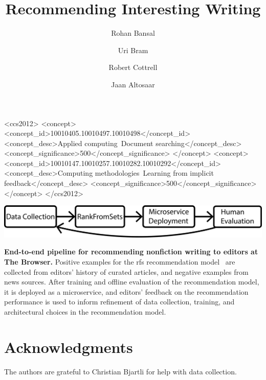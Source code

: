 \documentclass[sigconf]{acmart} %
\title{Recommending Interesting Writing}
\author{Rohan Bansal}
\affiliation{\institution{The Browser}}
\author{Uri Bram}
\affiliation{\institution{The Browser}}
\author{Robert Cottrell}
\affiliation{\institution{The Browser}}
\author{Jaan Altosaar}
\affiliation{\institution{Princeton University}}
\begin{document}

\begin{CCSXML}
<ccs2012>
   <concept>
       <concept_id>10010405.10010497.10010498</concept_id>
       <concept_desc>Applied computing~Document searching</concept_desc>
       <concept_significance>500</concept_significance>
       </concept>
   <concept>
       <concept_id>10010147.10010257.10010282.10010292</concept_id>
       <concept_desc>Computing methodologies~Learning from implicit feedback</concept_desc>
       <concept_significance>500</concept_significance>
       </concept>
 </ccs2012>
\end{CCSXML}



\begin{teaserfigure}
  \includegraphics[width=\textwidth]{fig/pipeline.pdf}
  \caption{\textbf{End-to-end pipeline for recommending nonfiction writing to editors at The Browser.} Positive examples for the \acrlong{rfs} recommendation model~\citep{altosaar2020rankfromsets:} are collected from editors' history of curated articles, and negative examples from news sources. After training and offline evaluation of the recommendation model, it is deployed as a microservice, and editors' feedback on the recommendation performance is used to inform refinement of data collection, training, and architectural choices in the recommendation model.}
  \label{fig:pipeline}
\end{teaserfigure}

\maketitle

% 




\section*{Acknowledgments}
The authors are grateful to Christian Bjartli for help with data collection.


\end{document}
